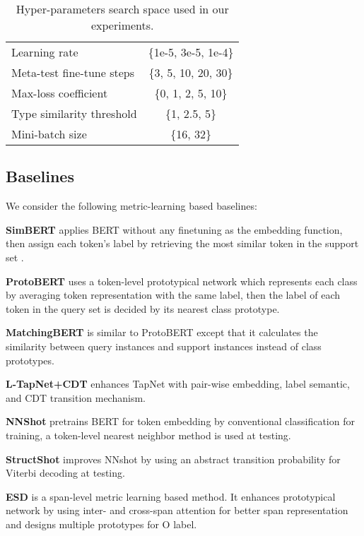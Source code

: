 \documentclass[11pt]{article}
\begin{document}
\begin{table}[htb]
\centering
\small
\begin{tabular}{lc}
\toprule
Learning rate & \{1e-5, 3e-5, 1e-4\} \\
Meta-test fine-tune steps & \{3, 5, 10, 20, 30\} \\
Max-loss coefficient  & \{0, 1, 2, 5, 10\} \\
Type similarity threshold & \{1, 2.5, 5\} \\
Mini-batch size & \{16, 32\} \\ 
\bottomrule
\end{tabular}
\caption{Hyper-parameters search space used in our experiments.}
\label{tab:hyper-parameters}
\end{table}

\subsection{Baselines}
\label{ref:baselines}
We consider the following metric-learning based baselines:

\textbf{SimBERT} \citep{hou2020few} applies BERT without any finetuning as the embedding function, then assign each token's label by retrieving the most similar token in the support set .

\textbf{ProtoBERT} \citep{fritzler2019few} uses a token-level prototypical network \citep{snell2017proto} which represents each class by averaging token representation with the same label, then the label of each token in the query set is decided by its nearest class prototype.

\textbf{MatchingBERT} \citep{vinyal-2016-matchnet} is similar to ProtoBERT except that it calculates the similarity between query instances and support instances instead of class prototypes.

\textbf{L-TapNet+CDT} \citep{hou2020few} enhances TapNet \citep{yoon-2019-tapnet} with pair-wise embedding, label semantic, and CDT transition mechanism. 

\textbf{NNShot} \citep{yang2020simple} pretrains BERT for token embedding by conventional classification for training, a token-level nearest neighbor method is used at testing.

\textbf{StructShot} \citep{yang2020simple} improves NNshot by using an abstract transition probability for Viterbi decoding at testing.

\textbf{ESD} \citep{wang2021enhanced} is a span-level metric learning based method. It enhances prototypical network by using inter- and cross-span attention for better span representation and designs multiple prototypes for O label. 
\end{document}
